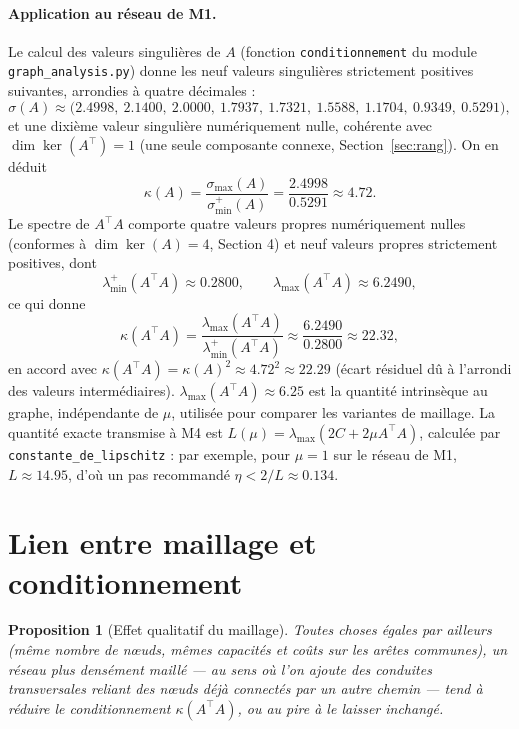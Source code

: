 \documentclass[11pt,a4paper]{article}
\theoremstyle{plain}
\newtheorem{proposition}{Proposition}
\theoremstyle{definition}
\theoremstyle{remark}
\begin{document}
\paragraph{Application au réseau de M1.} Le calcul des valeurs
singulières de $A$ (fonction \texttt{conditionnement} du module
\texttt{graph\_analysis.py}) donne les neuf valeurs singulières strictement
positives suivantes, arrondies à quatre décimales :
\begin{equation}
\sigma(A) \approx \big(2.4998,\ 2.1400,\ 2.0000,\ 1.7937,\ 1.7321,\ 1.5588,\ 1.1704,\ 0.9349,\ 0.5291\big),
\end{equation}
et une dixième valeur singulière numériquement nulle, cohérente avec
$\dim \ker(A^\top) = 1$ (une seule composante connexe, Section~\ref{sec:rang}).
On en déduit
\begin{equation}
\kappa(A) = \frac{\sigma_{\max}(A)}{\sigma_{\min}^{+}(A)} = \frac{2.4998}{0.5291} \approx 4.72.
\end{equation}
Le spectre de $A^\top A$ comporte quatre valeurs propres numériquement
nulles (conformes à $\dim \ker(A) = 4$, Section 4) et neuf valeurs propres
strictement positives, dont
\begin{equation}
\lambda_{\min}^{+}(A^\top A) \approx 0.2800, \qquad
\lambda_{\max}(A^\top A) \approx 6.2490,
\end{equation}
ce qui donne
\begin{equation}
\kappa(A^\top A) = \frac{\lambda_{\max}(A^\top A)}{\lambda_{\min}^{+}(A^\top A)} \approx \frac{6.2490}{0.2800} \approx 22.32,
\end{equation}
en accord avec $\kappa(A^\top A) = \kappa(A)^2 \approx 4.72^2 \approx 22.29$
(écart résiduel dû à l'arrondi des valeurs intermédiaires). $\lambda_{\max}(A^\top A) \approx 6.25$
est la quantité intrinsèque au graphe, indépendante de $\mu$, utilisée pour
comparer les variantes de maillage. La quantité exacte transmise à M4 est
$L(\mu) = \lambda_{\max}(2C + 2\mu A^\top A)$, calculée par
\texttt{constante\_de\_lipschitz} : par exemple, pour $\mu = 1$ sur le
réseau de M1, $L \approx 14.95$, d'où un pas recommandé
$\eta < 2/L \approx 0.134$.

\section{Lien entre maillage et conditionnement}

\begin{proposition}[Effet qualitatif du maillage]
Toutes choses égales par ailleurs (même nombre de nœuds, mêmes capacités
et coûts sur les arêtes communes), un réseau plus densément maillé --- au
sens où l'on ajoute des conduites transversales reliant des nœuds déjà
connectés par un autre chemin --- tend à réduire le conditionnement
$\kappa(A^\top A)$, ou au pire à le laisser inchangé.
\end{proposition}
\end{document}
